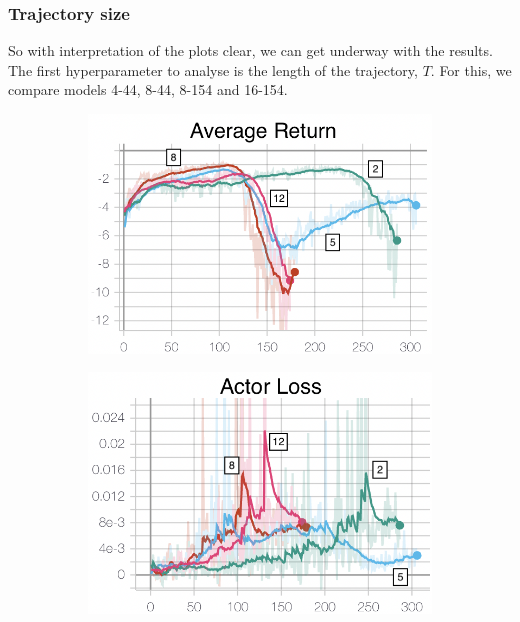 \subsubsection{Trajectory size}
So with interpretation of the plots clear, we can get underway with the results. The first hyperparameter to analyse is the length of the trajectory, $T$. For this, we compare models 4-44, 8-44, 8-154 and 16-154. 
\begin{figure}[hbt]
     \centering
     \begin{subfigure}[b]{0.32\textwidth}
         \centering
         \includegraphics[width=\textwidth]{figures/5_/Training/ppo_trajectory_avgReturn.png}
         \caption{}
         \label{fig:5_training_ppo_trajectoryAvgReturn}
     \end{subfigure} 
     \hfill
     \begin{subfigure}[b]{0.32\textwidth}
         \centering
         \includegraphics[width=\textwidth]{figures/5_/Training/ppo_trajectory_actorLoss.png}

\end{subfigure}
\end{figure}
